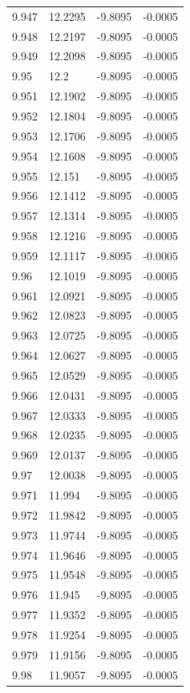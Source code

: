 \begin{tabular}{llll}
9.947 & 12.2295 & -9.8095 & -0.0005 \\
9.948 & 12.2197 & -9.8095 & -0.0005 \\
9.949 & 12.2098 & -9.8095 & -0.0005 \\
9.95 & 12.2 & -9.8095 & -0.0005 \\
9.951 & 12.1902 & -9.8095 & -0.0005 \\
9.952 & 12.1804 & -9.8095 & -0.0005 \\
9.953 & 12.1706 & -9.8095 & -0.0005 \\
9.954 & 12.1608 & -9.8095 & -0.0005 \\
9.955 & 12.151 & -9.8095 & -0.0005 \\
9.956 & 12.1412 & -9.8095 & -0.0005 \\
9.957 & 12.1314 & -9.8095 & -0.0005 \\
9.958 & 12.1216 & -9.8095 & -0.0005 \\
9.959 & 12.1117 & -9.8095 & -0.0005 \\
9.96 & 12.1019 & -9.8095 & -0.0005 \\
9.961 & 12.0921 & -9.8095 & -0.0005 \\
9.962 & 12.0823 & -9.8095 & -0.0005 \\
9.963 & 12.0725 & -9.8095 & -0.0005 \\
9.964 & 12.0627 & -9.8095 & -0.0005 \\
9.965 & 12.0529 & -9.8095 & -0.0005 \\
9.966 & 12.0431 & -9.8095 & -0.0005 \\
9.967 & 12.0333 & -9.8095 & -0.0005 \\
9.968 & 12.0235 & -9.8095 & -0.0005 \\
9.969 & 12.0137 & -9.8095 & -0.0005 \\
9.97 & 12.0038 & -9.8095 & -0.0005 \\
9.971 & 11.994 & -9.8095 & -0.0005 \\
9.972 & 11.9842 & -9.8095 & -0.0005 \\
9.973 & 11.9744 & -9.8095 & -0.0005 \\
9.974 & 11.9646 & -9.8095 & -0.0005 \\
9.975 & 11.9548 & -9.8095 & -0.0005 \\
9.976 & 11.945 & -9.8095 & -0.0005 \\
9.977 & 11.9352 & -9.8095 & -0.0005 \\
9.978 & 11.9254 & -9.8095 & -0.0005 \\
9.979 & 11.9156 & -9.8095 & -0.0005 \\
9.98 & 11.9057 & -9.8095 & -0.0005 \\

\end{tabular}
